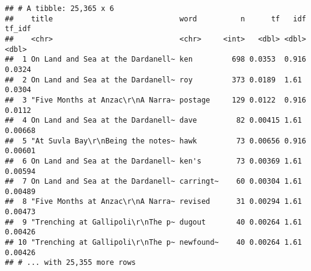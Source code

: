 \documentclass[]{article}
\newenvironment{Shaded}{\begin{snugshade}}{\end{snugshade}}
\newcommand{\DataTypeTok}[1]{\textcolor[rgb]{0.13,0.29,0.53}{#1}}
\newcommand{\DecValTok}[1]{\textcolor[rgb]{0.00,0.00,0.81}{#1}}
\newcommand{\KeywordTok}[1]{\textcolor[rgb]{0.13,0.29,0.53}{\textbf{#1}}}
\newcommand{\NormalTok}[1]{#1}
\newcommand{\OperatorTok}[1]{\textcolor[rgb]{0.81,0.36,0.00}{\textbf{#1}}}
\newcommand{\OtherTok}[1]{\textcolor[rgb]{0.56,0.35,0.01}{#1}}
\newcommand{\StringTok}[1]{\textcolor[rgb]{0.31,0.60,0.02}{#1}}
\begin{document}
\begin{verbatim}
## # A tibble: 25,365 x 6
##    title                             word          n      tf   idf  tf_idf
##    <chr>                             <chr>     <int>   <dbl> <dbl>   <dbl>
##  1 On Land and Sea at the Dardanell~ ken         698 0.0353  0.916 0.0324 
##  2 On Land and Sea at the Dardanell~ roy         373 0.0189  1.61  0.0304 
##  3 "Five Months at Anzac\r\nA Narra~ postage     129 0.0122  0.916 0.0112 
##  4 On Land and Sea at the Dardanell~ dave         82 0.00415 1.61  0.00668
##  5 "At Suvla Bay\r\nBeing the notes~ hawk         73 0.00656 0.916 0.00601
##  6 On Land and Sea at the Dardanell~ ken's        73 0.00369 1.61  0.00594
##  7 On Land and Sea at the Dardanell~ carringt~    60 0.00304 1.61  0.00489
##  8 "Five Months at Anzac\r\nA Narra~ revised      31 0.00294 1.61  0.00473
##  9 "Trenching at Gallipoli\r\nThe p~ dugout       40 0.00264 1.61  0.00426
## 10 "Trenching at Gallipoli\r\nThe p~ newfound~    40 0.00264 1.61  0.00426
## # ... with 25,355 more rows
\end{verbatim}

\begin{Shaded}
\end{Shaded}
\end{document}
